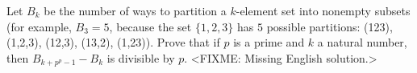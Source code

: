 \problem{}
Let $B_k$ be the number of ways to partition a $k$-element set into nonempty
subsets (for example, $B_3 = 5$, because the set $\{1, 2, 3\}$ has $5$ possible
partitions:
\textsf{(123)}, \textsf{(1,2,3)}, \textsf{(12,3)}, \textsf{(13,2)},
\textsf{(1,23)}).
Prove that if $p$ is a prime and $k$ a natural number, then
$B_{k + p^p - 1} - B_k$ is divisible by $p$.
\solution
<FIXME: Missing English solution.>
\endproblem
